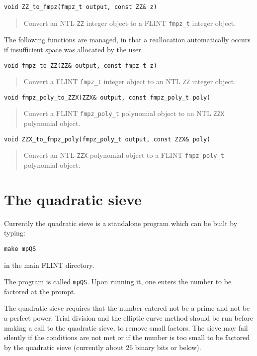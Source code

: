\documentclass[a4paper,10pt]{article}
\newcommand{\code}{\lstinline}
\begin{document}
\begin{lstlisting}
void ZZ_to_fmpz(fmpz_t output, const ZZ& z)
\end{lstlisting}
\begin{quote}
Convert an NTL \code{ZZ} integer object to a FLINT \code{fmpz_t} integer object.
\end{quote}

The following functions are managed, in that a reallocation automatically occurs if insufficient space was allocated by the user.

\begin{lstlisting}
void fmpz_to_ZZ(ZZ& output, const fmpz_t z)
\end{lstlisting}
\begin{quote}
Convert a FLINT \code{fmpz_t} integer object to an NTL \code{ZZ} integer object.
\end{quote}

\begin{lstlisting}
void fmpz_poly_to_ZZX(ZZX& output, const fmpz_poly_t poly)
\end{lstlisting}
\begin{quote}
Convert a FLINT \code{fmpz_poly_t} polynomial object to an NTL \code{ZZX} polynomial object.
\end{quote}

\begin{lstlisting}
void ZZX_to_fmpz_poly(fmpz_poly_t output, const ZZX& poly)
\end{lstlisting}
\begin{quote}
Convert an NTL \code{ZZX} polynomial object to a FLINT \code{fmpz_poly_t} polynomial object.
\end{quote}

\section{The quadratic sieve}
Currently the quadratic sieve is a standalone program which can be built by typing:

\code{make mpQS}

in the main FLINT directory.

The program is called \code{mpQS}. Upon running it, one enters the number to be factored at the prompt. 

The quadratic sieve requires that the number entered not be a prime and not be a perfect power. Trial division and the elliptic curve method should be run before making a call to the quadratic sieve, to remove small factors. The sieve may fail silently if the conditions are not met or if the number is too small to be factored by the quadratic sieve (currently about 26 binary bits or below).
\end{document}
